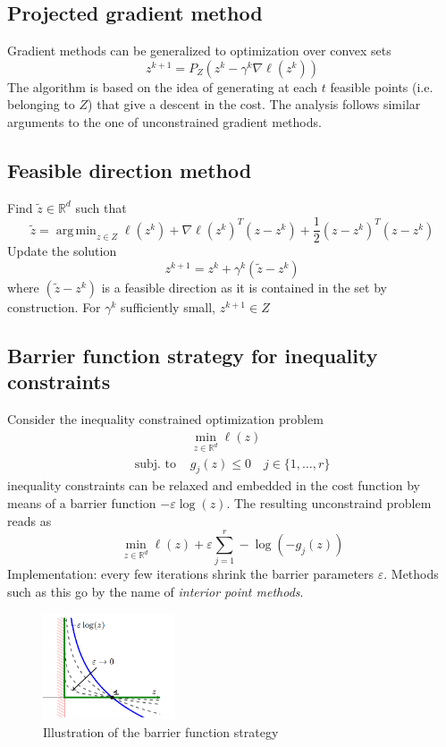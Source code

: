 \documentclass[openany]{book}
\DeclareMathOperator*{\argmin}{arg\,min}  %
\newcommand{\R}{\mathbb{R}}               %
\theoremstyle{definition}
\theoremstyle{remark}
\begin{document}
\subsection{Projected gradient method}

Gradient methods can be generalized to optimization over convex sets 
\[
    z^{k+1}=P_Z(z^k-\gamma^k\nabla\ell(z^k))
\]
The algorithm is based on the idea of generating at each $t$ feasible points (i.e. belonging to $Z$) that give a descent in the cost. The analysis follows similar arguments to the one of unconstrained gradient methods.

\subsection{Feasible direction method}

Find $\tilde{z}\in\R^d$ such that 
\[
    \tilde{z} = \argmin_{z\in Z} \ell(z^k)+\nabla\ell(z^k)^T(z-z^k)+\displaystyle\frac{1}{2}(z-z^k)^T(z-z^k)
\]
Update the solution 
\[
    z^{k+1}=z^k+\gamma^k(\tilde{z}-z^k)
\]
where $(\tilde{z}-z^k)$ is a feasible direction as it is contained in the set by construction. For $\gamma^k$ sufficiently small, $z^{k+1}\in Z$

\subsection{Barrier function strategy for inequality constraints}

Consider the inequality constrained optimization problem 
\begin{align*}
    &\min_{z\in\R^d}\ell(z)\\
    \text{subj. to } &g_j(z)\leq 0 \quad j\in \{1,\dots,r\}
\end{align*}  
inequality constraints can be relaxed and embedded in the cost function by means of a barrier function $-\varepsilon \log(z)$. The resulting unconstraind problem reads as 
\[
    \min_{z\in\R^d} \ell(z) + \varepsilon \displaystyle\sum_{j=1}^{r}-\log(-g_j(z))
\]
Implementation: every few iterations shrink the barrier parameters $\varepsilon$.
Methods such as this go by the name of \emph{interior point methods}.
\begin{figure}[ht]
    \centering
    \includegraphics[width=0.35\textwidth]{barrier}
    \caption{Illustration of the barrier function strategy}
\end{figure}
\end{document}
